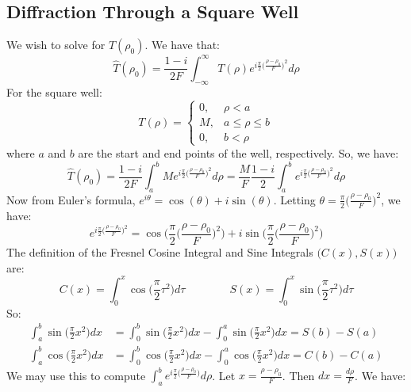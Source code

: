 \documentclass[oneside]{book}
\theoremstyle{mystyle}
\begin{document}
\subsection{Diffraction Through a Square Well}
We wish to solve for $\hat{T}(\rho_{0})$. We have that:
\begin{equation*}
\hat{T}(\rho_0) = \frac{1-i}{2F}\int_{-\infty}^{\infty}T(\rho)e^{i\frac{\pi}{2}\big(\frac{\rho-\rho_0}{F}\big)^2}d\rho
\end{equation*}
For the square well:
\begin{equation*}
T(\rho) = \begin{cases} 0, & \rho<a \\ M, & a \leq \rho \leq b \\ 0, & b < \rho\end{cases}
\end{equation*}
where $a$ and $b$ are the start and end points of the well, respectively. So, we have:
\begin{equation*}
\hat{T}(\rho_0) = \frac{1-i}{2F}\int_{a}^{b}Me^{i\frac{\pi}{2}\big(\frac{\rho-\rho_0}{F}\big)^2}d\rho = \frac{M}{F}\frac{1-i}{2}\int_{a}^{b}e^{i\frac{\pi}{2}\big(\frac{\rho-\rho_0}{F}\big)^2}d\rho
\end{equation*}
Now from Euler's formula, $e^{i\theta} = \cos(\theta)+i\sin(\theta).$ Letting $\theta = \frac{\pi}{2}\big(\frac{\rho-\rho_0}{F}\big)^2$, we have:
\begin{equation*}
e^{i\frac{\pi}{2}\big(\frac{\rho-\rho_0}{F}\big)^2} = \cos\bigg(\frac{\pi}{2}\big(\frac{\rho-\rho_0}{F}\big)^2\bigg)+i\sin\bigg(\frac{\pi}{2}\big(\frac{\rho-\rho_0}{F}\big)^2\bigg)
\end{equation*}
The definition of the Fresnel Cosine Integral and Sine Integrals $\big(C(x),S(x)\big)$ are:
\begin{equation*}
C(x) = \int_{0}^{x} \cos\big(\frac{\pi}{2}\tau^2\big)d\tau \quad\quad\quad\quad S(x) = \int_{0}^{x} \sin\big(\frac{\pi}{2}\tau^2\big)d\tau
\end{equation*}
So:
\begin{align*}
\int_{a}^{b} \sin\bigg(\frac{\pi}{2}x^2\bigg)dx &= \int_{0}^{b}\sin\bigg(\frac{\pi}{2}x^2\bigg)dx - \int_{0}^{a}\sin\bigg(\frac{\pi}{2}x^2\bigg)dx = S(b) - S(a) \\
\int_{a}^{b} \cos\bigg(\frac{\pi}{2}x^2\bigg)dx &= \int_{0}^{b} \cos\bigg(\frac{\pi}{2}x^2\bigg)dx - \int_{0}^{a}\cos\bigg(\frac{\pi}{2}x^2\bigg)dx = C(b) - C(a)
\end{align*}
We may use this to compute $\int_{a}^{b} e^{i\frac{\pi}{2}\big(\frac{\rho-\rho_0}{F}\big)}d\rho$. Let $x=\frac{\rho-\rho_0}{F}$. Then $dx = \frac{d\rho}{F}$. We have:
\end{document}
